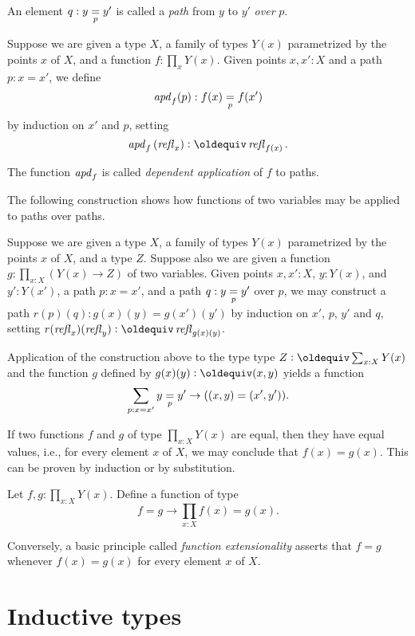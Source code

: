 An element $q : \pathover y Y p {y'}$ is called a {\em path} from $y$ to $y'$ {\em over} $p$.

\begin{definition}\label{def:apd}
  Suppose we are given a type $X$, a family of types $Y(x)$ parametrized by the points $x$ of $X$, and a function $f:\prod_x Y(x)$.
  Given points $x,x':X$ and a path $p : x = x'$, we define $$\apd{f}(p) : \pathover {f(x)} Y p {f(x')}$$ by induction on $x'$ and $p$,
  setting $$\apd f {(\refl x)} \defeq \refl {f(x)}.$$
\end{definition}

The function $\apd f$ is called {\em dependent application} of $f$ to paths.

The following construction shows how functions of two variables may be applied to paths over paths.

\begin{definition}
  Suppose we are given a type $X$, a family of types $Y(x)$ parametrized by the points $x$ of $X$, and a type $Z$.
  Suppose also we are given a function $g : \prod_{x:X} (Y(x) \to Z)$ of two variables.
  Given points $x,x':X$, $y:Y(x)$, and
  $y':Y(x')$, a path $p : x = x'$, and a path $q :\pathover y Y p {y'}$ over $p$,
  we may construct a path $r(p)(q) : g(x)(y) = g(x')(y')$ by induction on $x'$, $p$, $y'$ and $q$,
  setting $r{(\refl x)}{(\refl y)} \defeq \refl {g(x)(y)}$.
\end{definition}

Application of the construction above to the type type $Z \defeq \sum_{x:X} Y(x)$ and the function $g$ defined by $g(x)(y) \defeq (x,y)$ yields
a function $$\sum_{p:x=x'} \pathover y Y p {y'} \to ((x,y) = (x',y')).$$

If two functions $f$ and $g$ of type $\prod_{x:X} Y(x)$ are equal, 
then they have equal values, i.e., for every element $x$ of $X$, 
we may conclude that $f(x) = g(x)$.
This can be proven by induction or by substitution.
\begin{xca}\label{happly}
Let $f,g:\prod_{x:X} Y(x)$. Define a function of type 
\[ 
f=g \to \prod_{x:X} f(x)=g(x).
\] 
\end{xca}

Conversely, a basic principle called {\em function extensionality}
asserts that $f=g$ whenever $f(x) = g(x)$ for every element $x$ of $X$.

\section{Inductive types}
\label{sec:inductive-types}

